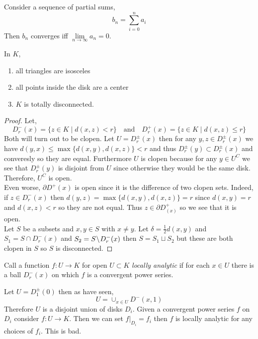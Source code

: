 \documentclass[12pt]{article}
\begin{document}
\begin{prop}
Consider a sequence of partial sums,
\[ b_n = \sum_{i = 0}^n a_i \]
Then $b_n$ converges iff $\lim\limits_{n \to \infty} a_n = 0$.
\end{prop}

\begin{prop}
In $K$,
\begin{enumerate}
\item all triangles are isosceles
\item all points inside the disk are a center
\item $K$ is totally disconnected.
\end{enumerate}
\end{prop}

\begin{proof}
Let,
\[ D^-_r(x) = \{ z \in K \mid d(x, z) < r \} \quad \text{and} \quad D^+_r(x) = \{ z \in K \mid d(x, z) \le r \} \]
Both will turn out to be clopen. Let $U = D^{\pm}_r(x)$ then for any $y,z \in D^{\pm}_r(x)$ we have $d(y,x) \le \max \{ d(x,y), d(x,z) \} < r$ and thus $D^{\pm}_r(y) \subset D^{\pm}_r(x)$ and converesly so they are equal. Furthermore $U$ is clopen because for any $y \in U^C$ we see that $D^{\pm}_r(y)$ is disjoint from $U$ since otherwise they would be the same disk. Therefore, $U^C$ is open. 
\bigskip\\
Even worse, $\partial D^+(x)$ is open since it is the difference of two clopen sets. Indeed, if $z \in D^{-}_r(x)$ then $d(y, z) = \max \{ d(x,y), d(x, z) \} = r$ since $d(x,y) = r$ and $d(x,z) < r$ so they are not equal. Thus $z \in \partial D^+_(x)$ so we see that it is open.
\bigskip\\
Let $S$ be a subsets and $x,y \in S$ with $x \neq y$. Let $\delta = \tfrac{1}{2} d(x,y)$ and $S_1 = S \cap D^{-}_r(x)$ and $S_2 = S \! \setminus \! D^{-}_r(x)$ then $S = S_1 \sqcup S_2$ but these are both clopen in $S$ so $S$ is disconnected.
\end{proof}

\begin{defn}
Call a function $f : U \to K$ for open $U \subset K$ \textit{locally analytic} if for each $x \in U$ there is a ball $D^{-}_r(x)$ on which $f$ is a convergent power series.
\end{defn}

\begin{example}
Let $U = D^{\pm}_1(0)$ then as have seen,
\[ U = \cup_{x \in U} D^{-}(x, 1) \]
Therefore $U$ is a disjoint union of disks $D_i$. Given a convergent power series $f$ on $D_i$ consider $f : U \to K$. Then we can set $f |_{D_i} = f_i$ then $f$ is locally analytic for any choices of $f_i$. This is bad.
\end{example}
\end{document}
